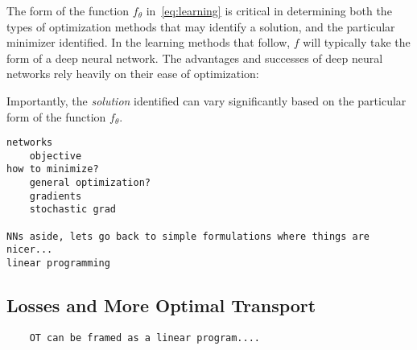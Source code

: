 The form of the function $f_\theta$ in~\eqref{eq:learning}
is critical in determining both
the types of optimization methods
that may identify a solution,
and the particular minimizer identified.
In the learning methods that follow,
$f$ will typically take the form of 
a deep neural network.
The advantages
and successes of deep neural networks
rely heavily on their ease of optimization:



Importantly,
the \textit{solution} identified can 
vary significantly based on the particular form 
of the function $f_\theta$.

\begin{verbatim}
networks
    objective
how to minimize?
    general optimization?
    gradients
    stochastic grad

NNs aside, lets go back to simple formulations where things are nicer...
linear programming
\end{verbatim}

\subsection{Losses and More Optimal Transport}
\begin{verbatim}
    OT can be framed as a linear program....
\end{verbatim}
    
